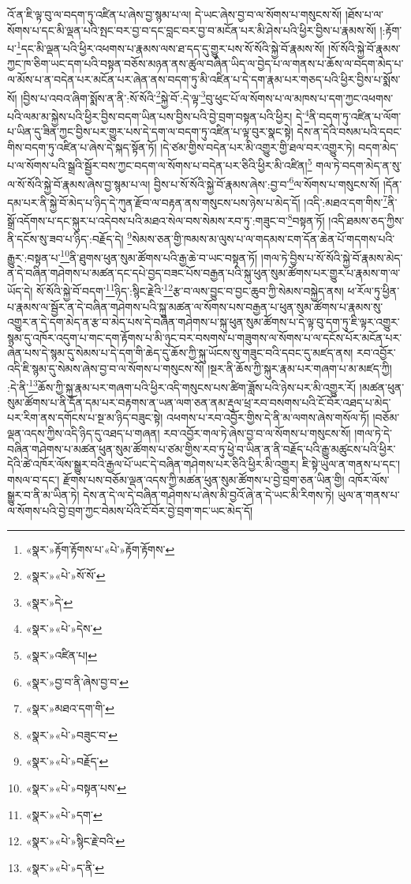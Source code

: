 འོ་ན་ཇི་ལྟ་བུ་ལ་བདག་ཏུ་འཛིན་པ་ཞེས་བྱ་སྙམ་པ་ལ། དེ་ཡང་ཞེས་བྱ་བ་ལ་སོགས་པ་གསུངས་སོ། །ཐོས་པ་ལ་སོགས་པ་དང་མི་ལྡན་པའི་སྤང་བར་བྱ་བ་དང་བླང་བར་བྱ་བ་མངོན་པར་མི་ཤེས་པའི་ཕྱིར་བྱིས་པ་རྣམས་སོ། །:རྟོག་པ་\footnote{«སྣར་»རྟོག་རྟོགས་པ་«པེ་»རྟོག་རྟོགས་}དང་མི་ལྡན་པའི་ཕྱིར་འཕགས་པ་རྣམས་ལས་ཐ་དད་དུ་གྱུར་པས་སོ་སོའི་སྐྱེ་བོ་རྣམས་སོ། །སོ་སོའི་སྐྱེ་བོ་རྣམས་ཀྱང་ཁ་ཅིག་ཡང་དག་པའི་བསྟན་བཅོས་མཉན་ནས་ཚུལ་བཞིན་ཡིད་ལ་བྱེད་པ་ལ་གནས་པ་ཆོས་ལ་བདག་མེད་པ་ལ་མོས་པ་ན་བདེན་པར་མངོན་པར་ཞེན་ནས་བདག་ཏུ་མི་འཛིན་པ་དེ་དག་རྣམ་པར་གཅད་པའི་ཕྱིར་བྱིས་པ་སྨོས་སོ། །བྱིས་པ་འབའ་ཞིག་སྨོས་ན་ནི་:སོ་སོའི་\footnote{«སྣར་»«པེ་»སོ་སོ་}སྐྱེ་བོ་:དེ་ལྟ་\footnote{«སྣར་»དེ་}བུ་ཕུང་པོ་ལ་སོགས་པ་ལ་མཁས་པ་དག་ཀྱང་འཕགས་པའི་ལམ་མ་སྐྱེས་པའི་ཕྱིར་བྱིས་བདག་ཡིན་པས་བྱིས་པའི་བྱེ་བྲག་བསྟན་པའི་ཕྱིར། དེ་\footnote{«སྣར་»«པེ་»དེས་}ནི་བདག་ཏུ་འཛིན་པ་ལོག་པ་ཡིན་དུ་ཟིན་ཀྱང་བྱིས་པར་གྱུར་པས་དེ་དག་ལ་བདག་ཏུ་འཛིན་པ་ལྟ་བུར་སྣང་སྟེ། དེས་ན་དེའི་བསམ་པའི་དབང་གིས་བདག་ཏུ་འཛིན་པ་ཞེས་དེ་སྐད་སྟོན་ཏོ། །དེ་ཙམ་གྱིས་བདེན་པར་མི་འགྱུར་གྱི་ཐལ་བར་འགྱུར་ཏེ། བདག་མེད་པ་ལ་སོགས་པའི་སྒྲའི་སྦྱོར་བས་ཀྱང་བདག་ལ་སོགས་པ་བདེན་པར་ཅིའི་ཕྱིར་མི་འཛིན།\footnote{«སྣར་»འཛིན་པ།} གལ་ཏེ་བདག་མེད་ན་སུ་ལ་སོ་སོའི་སྐྱེ་བོ་རྣམས་ཞེས་བྱ་སྙམ་པ་ལ། བྱིས་པ་སོ་སོའི་སྐྱེ་བོ་རྣམས་ཞེས་:བྱ་བ་\footnote{«སྣར་»བྱ་བ་ནི་ཞེས་བྱ་བ་}ལ་སོགས་པ་གསུངས་སོ། །དོན་དམ་པར་ནི་སྐྱེ་བོ་མེད་པ་ཉིད་དེ་ཀུན་རྫོབ་ལ་བརྟན་ནས་གསུངས་པས་ཉེས་པ་མེད་དོ། །འདི་:མཐའ་དག་གིས་\footnote{«སྣར་»མཐའ་དག་གི་}ནི་སྒྲོ་འདོགས་པ་དང་སྐུར་པ་འདེབས་པའི་མཐའ་སེལ་བས་སེམས་རབ་ཏུ་:གཟུང་བ་\footnote{«སྣར་»«པེ་»བཟུང་བ་}བསྟན་ཏོ། །འདི་ཐམས་ཅད་ཀྱིས་ནི་དངོས་སུ་ཟབ་པ་ཉིད་:བརྗོད་དེ། \footnote{«སྣར་»«པེ་»བརྗོད་}སེམས་ཅན་གྱི་ཁམས་མ་ལུས་པ་ལ་གདམས་ངག་དོན་ཆེན་པོ་གདགས་པའི་རྒྱུར་:བསྟན་པ་\footnote{«སྣར་»«པེ་»བསྟན་པས་}ནི་ཐུགས་ཕུན་སུམ་ཚོགས་པའི་རྒྱ་ཆེ་བ་ཡང་བསྟན་ཏོ། །གལ་ཏེ་བྱིས་པ་སོ་སོའི་སྐྱེ་བོ་རྣམས་མེད་ན་དེ་བཞིན་གཤེགས་པ་མཚན་དང་དཔེ་བྱད་བཟང་པོས་བརྒྱན་པའི་སྐུ་ཕུན་སུམ་ཚོགས་པར་གྱུར་པ་རྣམས་ག་ལ་ཡོད་དེ། སོ་སོའི་སྐྱེ་བོ་བདག་\footnote{«སྣར་»«པེ་»དག་}ཉིད་:སྙིང་རྗེའི་\footnote{«སྣར་»«པེ་»སྙིང་རྗེ་བའི་}རྩ་བ་ལས་བྱུང་བ་བྱང་ཆུབ་ཀྱི་སེམས་བསྐྱེད་ནས། ཕ་རོལ་ཏུ་ཕྱིན་པ་རྣམས་ལ་སྦྱོར་ན་དེ་བཞིན་གཤེགས་པའི་སྐུ་མཚན་ལ་སོགས་པས་བརྒྱན་པ་ཕུན་སུམ་ཚོགས་པ་རྣམས་སུ་འགྱུར་ན་དེ་དག་མེད་ན་རྩ་བ་མེད་པས་དེ་བཞིན་གཤེགས་པ་སྐུ་ཕུན་སུམ་ཚོགས་པ་དེ་ལྟ་བུ་དག་ཏུ་ཇི་ལྟར་འགྱུར་སྙམ་དུ་འཁོར་འདུག་པ་གང་དག་རྟོགས་པ་མི་ཉུང་བར་བསགས་པ་གཟུགས་ལ་སོགས་པ་ལ་དངོས་པོར་མངོན་པར་ཞེན་པས་དེ་སྙམ་དུ་སེམས་པ་དེ་དག་གི་ཆེད་དུ་ཆོས་ཀྱི་སྐུ་ཡོངས་སུ་གཟུང་བའི་དབང་དུ་མཛད་ནས། རབ་འབྱོར་འདི་ཇི་སྙམ་དུ་སེམས་ཞེས་བྱ་བ་ལ་སོགས་པ་གསུངས་སོ། །སྔར་ནི་ཆོས་ཀྱི་སྐུར་རྣམ་པར་གཞག་པ་མ་མཛད་ཀྱི། :དེ་ནི་\footnote{«སྣར་»«པེ་»ད་ནི་}ཆོས་ཀྱི་སྐུ་རྣམ་པར་གཞག་པའི་ཕྱིར་འདི་གསུངས་པས་ཚིག་ཟློས་པའི་ཉེས་པར་མི་འགྱུར་རོ། །མཚན་ཕུན་སུམ་ཚོགས་པ་ནི་དོན་དམ་པར་བརྟགས་ན་ཡན་ལག་ཅན་ནམ་རྡུལ་ཕྲ་རབ་བསགས་པའི་ངོ་བོར་འཐད་པ་མེད་པར་རིག་ནས་དགོངས་པ་སྔ་མ་ཉིད་བཟུང་སྟེ། འཕགས་པ་རབ་འབྱོར་གྱིས་དེ་ནི་མ་ལགས་ཞེས་གསོལ་ཏོ། །བཅོམ་ལྡན་འདས་ཀྱིས་འདི་ཉིད་དུ་འཐད་པ་གཞན། རབ་འབྱོར་གལ་ཏེ་ཞེས་བྱ་བ་ལ་སོགས་པ་གསུངས་སོ། །གལ་ཏེ་དེ་བཞིན་གཤེགས་པ་མཚན་ཕུན་སུམ་ཚོགས་པ་ཙམ་གྱིས་རབ་ཏུ་ཕྱེ་བ་ཡིན་ན་ནི་བརྗོད་པའི་རྒྱུ་མཚུངས་པའི་ཕྱིར་དེའི་ཚེ་འཁོར་ལོས་སྒྱུར་བའི་རྒྱལ་པོ་ཡང་དེ་བཞིན་གཤེགས་པར་ཅིའི་ཕྱིར་མི་འགྱུར། ཇི་སྟེ་ཡུལ་ན་གནས་པ་དང་། གསལ་བ་དང་། རྫོགས་པས་བཅོམ་ལྡན་འདས་ཀྱི་མཚན་ཕུན་སུམ་ཚོགས་པ་བྱེ་བྲག་ཅན་ཡིན་གྱི། འཁོར་ལོས་སྒྱུར་བ་ནི་མ་ཡིན་ཏེ། དེས་ན་དེ་ལ་དེ་བཞིན་གཤེགས་པ་ཞེས་མི་བྱའོ་ཞེ་ན་དེ་ཡང་མི་རིགས་ཏེ། ཡུལ་ན་གནས་པ་ལ་སོགས་པའི་བྱེ་བྲག་ཀྱང་བེམས་པོའི་ངོ་བོར་བྱེ་བྲག་གང་ཡང་མེད་དོ། 